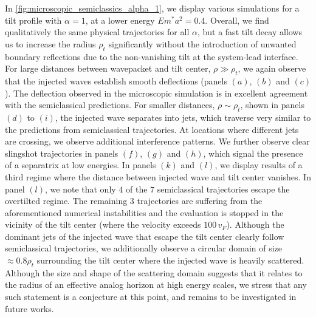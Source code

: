 \documentclass[submission, Phys]{SciPost}
\begin{document}
In \cref{fig:microscopic_semiclassics_alpha_1}, we display various simulations for a tilt profile with $\alpha=1$, at a lower energy $Em^*a^2=0.4$.
Overall, we find qualitatively the same physical trajectories for all $\alpha$, but a fast tilt decay allows us to increase the radius $\rho_t$ significantly without the introduction of unwanted boundary reflections due to the non-vanishing tilt at the system-lead interface.
For large distances between wavepacket and tilt center, $\rho\gg \rho_t$, we again observe that the injected waves establish smooth deflections (panels $(a)$, $(b)$ and $(c)$).
The deflection observed in the microscopic simulation is in excellent agreement with the semiclassical predictions. 
For smaller distances, $\rho\sim \rho_t$, shown in panels $(d)$ to $(i)$, the injected wave separates into jets, which traverse very similar to the predictions from semiclassical trajectories.
At locations where different jets are crossing, we observe additional interference patterns.
We further observe clear slingshot trajectories in panels $(f)$, $(g)$ and $(h)$, which signal the presence of a separatrix at low energies.
In panels $(k)$ and $(l)$, we display results of a third regime where the distance between injected wave and tilt center vanishes.
In panel $(l)$, we note that only $4$ of the $7$ semiclassical trajectories escape the overtilted regime.
The remaining $3$ trajectories are suffering from the aforementioned numerical instabilities and the evaluation is stopped in the vicinity of the tilt center (where the velocity exceeds $100\,v_F$).
Although the dominant jets of the injected wave that escape the tilt center clearly follow semiclassical trajectories, we additionally observe a circular domain of size $\approx 0.8 \rho_t$ surrounding the tilt center where the injected wave is heavily scattered.
Although the size and shape of the scattering domain suggests that it relates to the radius of an effective analog horizon at high energy scales, we stress that any such statement is a conjecture at this point, and remains to be investigated in future works.
\end{document}
